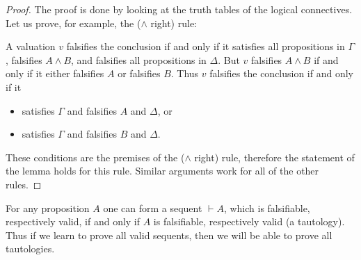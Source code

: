 

\setcounter{section}{2}
\setcounter{subsection}{5}
\setcounter{dfn}{9}

\begin{proof}
The proof is done by looking at the truth tables of the logical connectives.
Let us prove, for example, the ($\wedge$ right) rule:
\begin{prooftree}
\end{prooftree}
A valuation $v$ falsifies the conclusion if and only if
it satisfies all propositions in $\Gamma$, falsifies $A \wedge B$, and falsifies all propositions in $\Delta$.
But $v$ falsifies $A \wedge B$ if and only if it either falsifies $A$ or falsifies $B$.
Thus $v$ falsifies the conclusion if and only if it
\begin{itemize}
\item
satisfies $\Gamma$ and falsifies $A$ and $\Delta$, or
\item
satisfies $\Gamma$ and falsifies $B$ and $\Delta$.
\end{itemize}
These conditions are the premises of the ($\wedge$ right) rule, therefore the statement of the lemma holds for this rule.
Similar arguments work for all of the other rules.
\end{proof}

For any proposition $A$ one can form a sequent $\vdash A$, which is falsifiable, respectively valid, if and only if
$A$ is falsifiable, respectively valid (a tautology).
Thus if we learn to prove all valid sequents, then we will be able to prove all tautologies.




